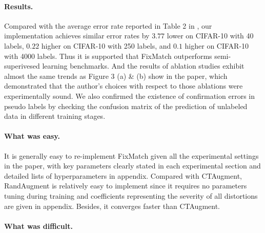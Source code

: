 \paragraph{Results.}


Compared with the average error rate reported in Table 2 in \cite{sohn2020fixmatch}, our implementation achieves similar error rates by $3.77$ lower on CIFAR-10 with 40 labels, $0.22$ higher on CIFAR-10 with 250 labels, and $0.1$ higher on CIFAR-10 with 4000 labels. Thus it is supported that FixMatch outperforms semi-superivesed learning benchmarks. And the results of ablation studies exhibit almost the same trends as Figure 3 (a) \& (b) show in the paper, which demonstrated that the author's choices with respect to those ablations were experimentally sound. We also confirmed the existence of confirmation errors in pseudo labels by checking the confusion matrix of the prediction of unlabeled data in different training stages.


\paragraph{What was easy.}
It is generally easy to re-implement FixMatch given all the experimental settings in the paper, with key parameters clearly stated in each experimental section and detailed lists of hyperparameters in appendix.
Compared with CTAugment, RandAugment is relatively easy to implement since it requires no parameters tuning during training and coefficients representing the severity of all distortions are given in appendix. Besides, it converges faster than CTAugment.

\paragraph{What was difficult.}

